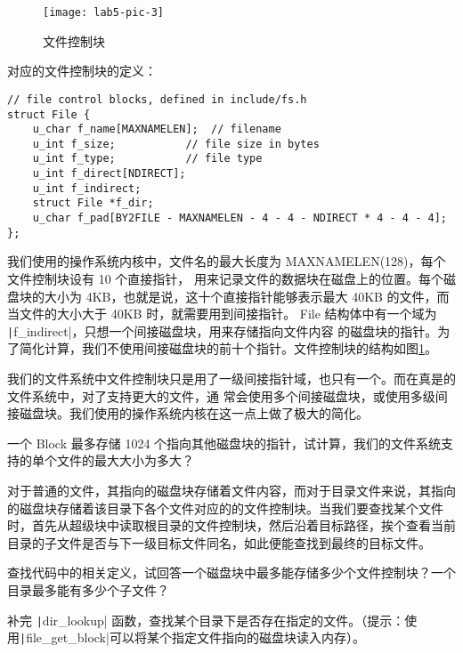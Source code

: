 \begin{figure}[htbp]
  \centering
  \texttt{[image: lab5-pic-3]}
  \caption{文件控制块}\label{lab5-pic-3}
\end{figure}

对应的文件控制块的定义：

\begin{verbatim}
// file control blocks, defined in include/fs.h
struct File {
    u_char f_name[MAXNAMELEN];  // filename
    u_int f_size;           // file size in bytes
    u_int f_type;           // file type
    u_int f_direct[NDIRECT];
    u_int f_indirect;
    struct File *f_dir;
    u_char f_pad[BY2FILE - MAXNAMELEN - 4 - 4 - NDIRECT * 4 - 4 - 4];
};
\end{verbatim}

我们使用的操作系统内核中，文件名的最大长度为 MAXNAMELEN(128)，每个文件控制块设有 10 个直接指针，
用来记录文件的数据块在磁盘上的位置。每个磁盘块的大小为 4KB，也就是说，这十个直接指针能够表示最大 40KB
的文件，而当文件的大小大于 40KB 时，就需要用到间接指针。
File 结构体中有一个域为 \texttt|f_indirect|，只想一个间接磁盘块，用来存储指向文件内容
的磁盘块的指针。为了简化计算，我们不使用间接磁盘块的前十个指针。文件控制块的结构如图\ref{lab5-pic-3}。

\begin{note}
我们的文件系统中文件控制块只是用了一级间接指针域，也只有一个。而在真是的文件系统中，对了支持更大的文件，通
常会使用多个间接磁盘块，或使用多级间接磁盘块。我们使用的操作系统内核在这一点上做了极大的简化。
\end{note}

\begin{thinking}\label{think-filesize}
一个 Block 最多存储 1024 个指向其他磁盘块的指针，试计算，我们的文件系统支持的单个文件的最大大小为多大？
\end{thinking}

对于普通的文件，其指向的磁盘块存储着文件内容，而对于目录文件来说，其指向的磁盘块存储着该目录下各个文件对应的的文件控制块。当我们要查找某个文件时，首先从超级块中读取根目录的文件控制块，然后沿着目标路径，挨个查看当前目录的子文件是否与下一级目标文件同名，如此便能查找到最终的目标文件。

\begin{thinking}\label{think-filenum}
查找代码中的相关定义，试回答一个磁盘块中最多能存储多少个文件控制块？一个目录最多能有多少个子文件？
\end{thinking}

\begin{exercise}
补完 \texttt|dir_lookup| 函数，查找某个目录下是否存在指定的文件。（提示：使用\texttt|file_get_block|可以将某个指定文件指向的磁盘块读入内存）。
\end{exercise}

